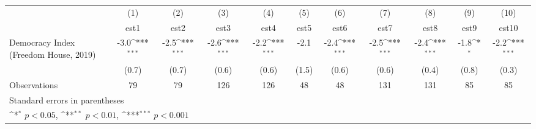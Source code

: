 {
\def\sym#1{\ifmmode^{#1}\else\(^{#1}\)\fi}
\begin{tabular}{l*{10}{c}}
\hline\hline
                    &\multicolumn{1}{c}{(1)}         &\multicolumn{1}{c}{(2)}         &\multicolumn{1}{c}{(3)}         &\multicolumn{1}{c}{(4)}         &\multicolumn{1}{c}{(5)}         &\multicolumn{1}{c}{(6)}         &\multicolumn{1}{c}{(7)}         &\multicolumn{1}{c}{(8)}         &\multicolumn{1}{c}{(9)}         &\multicolumn{1}{c}{(10)}         \\
                    &        est1         &        est2         &        est3         &        est4         &        est5         &        est6         &        est7         &        est8         &        est9         &       est10         \\
\hline
Democracy Index (Freedom House, 2019)&        -3.0\sym{***}&        -2.5\sym{***}&        -2.6\sym{***}&        -2.2\sym{***}&        -2.1         &        -2.4\sym{***}&        -2.5\sym{***}&        -2.4\sym{***}&        -1.8\sym{*}  &        -2.2\sym{***}\\
                    &       (0.7)         &       (0.7)         &       (0.6)         &       (0.6)         &       (1.5)         &       (0.6)         &       (0.6)         &       (0.4)         &       (0.8)         &       (0.3)         \\
\hline
Observations        &          79         &          79         &         126         &         126         &          48         &          48         &         131         &         131         &          85         &          85         \\
\hline\hline
\multicolumn{11}{l}{\footnotesize Standard errors in parentheses}\\
\multicolumn{11}{l}{\footnotesize \sym{*} \(p<0.05\), \sym{**} \(p<0.01\), \sym{***} \(p<0.001\)}\\
\end{tabular}
}
